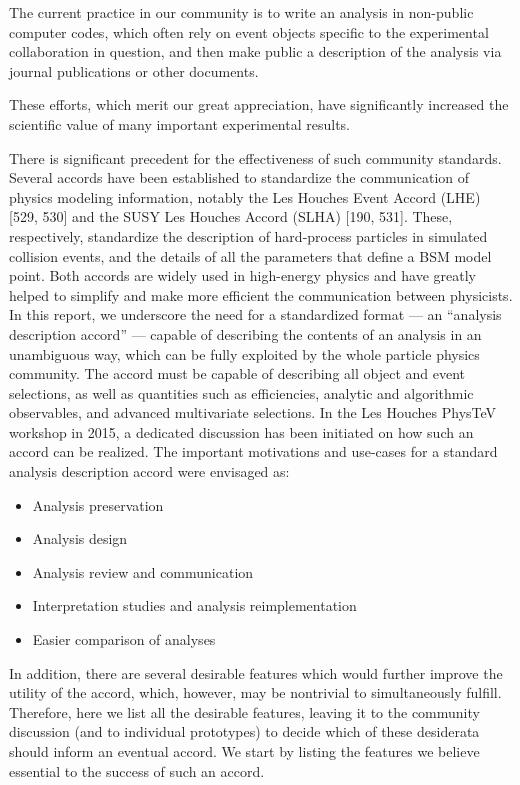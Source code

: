 \documentclass[11pt]{cernrep}
\begin{document}
The current practice in our community is to write an analysis in non-public computer codes, 
which often rely on event objects specific to the experimental collaboration in question,
and then make public a description of the analysis via journal publications or other documents.

These efforts, which merit our great appreciation, 
have significantly increased the scientific value of many important experimental results. 

There is significant precedent for the effectiveness of such community standards. Several
accords have been established to standardize the communication of physics modeling information, 
notably the Les Houches Event Accord (LHE) [529, 530] and the SUSY Les Houches Accord (SLHA) [190, 531].
These, respectively, standardize the description of hard-process
particles in simulated collision events, and the details of all the parameters that define a BSM model point.  
Both accords are widely used in high-energy physics and have greatly helped to
simplify and make more efficient the communication between physicists.
In this report, we underscore the need for a standardized format — an “analysis description
accord” — capable of describing the contents of an analysis in an unambiguous way, which can
be fully exploited by the whole particle physics community.  The accord must be capable of
describing all object and event selections, as well as quantities such as efficiencies, analytic and
algorithmic observables, and advanced multivariate selections.
In the Les Houches PhysTeV workshop in 2015, a dedicated discussion has been initiated 
on how such an accord can be realized. 
The important motivations and use-cases for a standard analysis description accord were envisaged as:
\begin{itemize}
  \item Analysis preservation
  \item Analysis design
  \item Analysis review and communication
  \item Interpretation studies and analysis reimplementation
  \item Easier comparison of analyses
\end{itemize}
In addition, there are several desirable features which would further improve the utility
of the accord, which, however, may be nontrivial to simultaneously fulfill.  Therefore, here
we list all the desirable features, leaving it to the community discussion (and to individual
prototypes) to decide which of these desiderata should inform an eventual accord. We start by
listing the features we believe essential to the success of such an accord.
\end{document}
